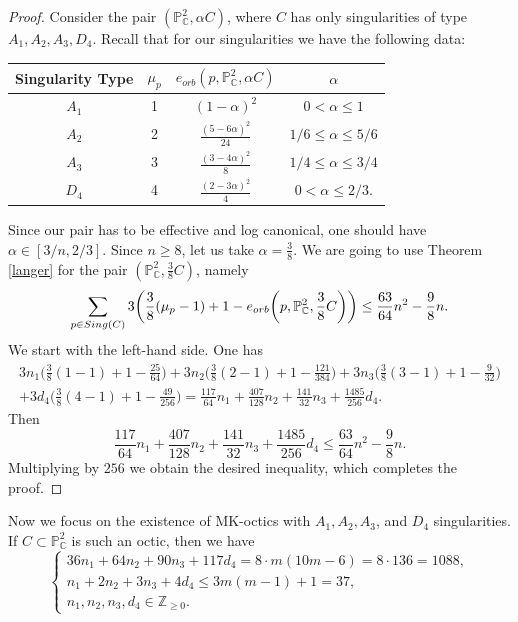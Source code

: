 \documentclass[11pt]{amsart}
\theoremstyle{plain}
\theoremstyle{definition}
\numberwithin{equation}{section}
\begin{document}
\begin{proof}
 Consider the pair $(\mathbb{P}^{2}_{\mathbb{C}}, \alpha C)$, where $C$ has only singularities of type $A_{1},A_{2},A_{3}, D_{4}$. Recall that for our singularities we have the following data:
\begin{table}[h]
\centering
\begin{tabular}{c|c|c|c}
 Singularity Type   & $\mu_{p}$ & $e_{orb}(p,\mathbb{P}^{2}_{\mathbb{C}},\alpha C)$ & $\alpha$ \\ \hline \hline
$A_{1}$ & 1 & $(1-\alpha)^{2}$ & $0 < \alpha \leq 1$ \\
$A_{2}$ & 2 & $\frac{(5-6\alpha)^{2}}{24}$ & $1/6 \leq \alpha \leq 5/6$  \\
$A_{3}$ & 3 & $\frac{(3-4\alpha)^{2}}{8}$ & $1/4 \leq \alpha \leq 3/4$  \\
$D_{4}$ & 4 & $\frac{(2-3\alpha)^{2}}{4}$ & $0<\alpha \leq 2/3$.

\end{tabular}
\end{table}

Since our pair has to be effective and log canonical, one should have $\alpha \in [3/n, 2/3]$. Since $n\geq 8$, let us take $\alpha=\frac{3}{8}$. We are going to use Theorem \ref{langer} for the pair 
$(\mathbb{P}^{2}_{\mathbb{C}}, \frac{3}{8}C)$, namely
\begin{gather*}
\sum_{p \in {\rm Sing}(C)}3\bigg(\frac{3}{8} (\mu_{p}-1)+1 - e_{orb}\bigg(p, \mathbb{P}^{2}_{\mathbb{C}},\frac{3}{8} C \bigg)\bigg) \leq \frac{63}{64}n^{2} - \frac{9}{8} n. 
\end{gather*}
We start with the left-hand side. One has
\begin{gather*}3n_{1}\bigg(\frac{3}{8}(1-1)+1-\frac{25}{64}\bigg) + 3n_{2}\bigg(\frac{3}{8}(2-1)+1-\frac{121}{384}\bigg) + 3n_{3}\bigg(\frac{3}{8}(3-1)+1-\frac{9}{32}\bigg)  \\ + 3d_{4}\bigg(\frac{3}{8}(4-1)+1-\frac{49}{256}\bigg) = \frac{117}{64}n_{1} + \frac{407}{128}n_{2} + \frac{141}{32}n_{3} + \frac{1485}{256}d_{4}.
\end{gather*}
Then
$$ \frac{117}{64}n_{1} + \frac{407}{128}n_{2} + \frac{141}{32}n_{3} + \frac{1485}{256}d_{4} \leq  \frac{63}{64}n^{2}-\frac{9}{8}n.$$
Multiplying by $256$ we obtain the desired inequality, which completes the proof.
\end{proof}
Now we focus on the existence of MK-octics with $A_{1},A_{2},A_{3}$, and $D_{4}$ singularities. If $C \subset \mathbb{P}^{2}_{\mathbb{C}}$ is such an octic, then we have
\[\begin{cases}
36n_{1} + 64n_{2} + 90n_{3}+117d_{4} = 8\cdot m(10m-6) = 8\cdot 136 = 1088, \\
n_{1}+2n_{2}+3n_{3}+4d_{4} \leq 3m(m-1)+1 = 37,\\
n_{1},n_{2},n_{3},d_{4} \in \mathbb{Z}_{\geq 0}.
\end{cases}\]
\end{document}
